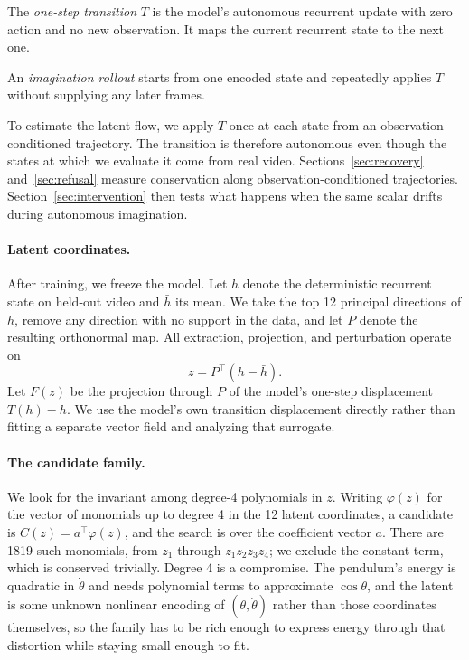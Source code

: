 The \emph{one-step transition} $T$ is the model's autonomous recurrent update with zero action and
no new observation. It maps the current recurrent state to the next one.

An \emph{imagination rollout} starts from one encoded state and repeatedly applies $T$ without
supplying any later frames.

To estimate the latent flow, we apply $T$ once at each state from an observation-conditioned
trajectory. The transition is therefore autonomous even though the states at which we evaluate it
come from real video. Sections~\ref{sec:recovery} and~\ref{sec:refusal} measure conservation along
observation-conditioned trajectories. Section~\ref{sec:intervention} then tests what happens when
the same scalar drifts during autonomous imagination.

\paragraph{Latent coordinates.} After training, we freeze the model. Let $h$ denote the
deterministic recurrent state on held-out video and $\bar h$ its mean. We take the top 12 principal
directions of $h$, remove any direction with no support in the data, and let $P$ denote the
resulting orthonormal map. All extraction, projection, and perturbation operate on
\begin{equation}
z = P^\top(h-\bar h).
\label{eq:z}
\end{equation}
Let $F(z)$ be the projection through $P$ of the model's one-step displacement $T(h)-h$. We use the
model's own transition displacement directly rather than fitting a separate vector field and
analyzing that surrogate.

\paragraph{The candidate family.} We look for the invariant among degree-4 polynomials in $z$.
Writing $\varphi(z)$ for the vector of monomials up to degree 4 in the 12 latent coordinates, a
candidate is $C(z) = a^\top\varphi(z)$, and the search is over the coefficient vector $a$. There are
1819 such monomials, from $z_1$ through $z_1z_2z_3z_4$; we exclude the constant term, which is
conserved trivially. Degree 4 is a compromise. The pendulum's energy is quadratic in $\dot\theta$
and needs polynomial terms to approximate $\cos\theta$, and the latent is some unknown nonlinear
encoding of $(\theta, \dot\theta)$ rather than those coordinates themselves, so the family has to be
rich enough to express energy through that distortion while staying small enough to fit.

